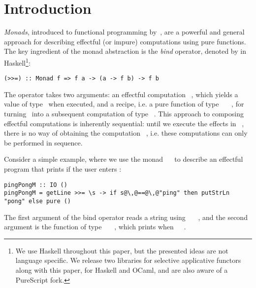 \section{Introduction}\label{sec-intro}


\emph{Monads}, introduced to functional programming
by~\citet{1995_wadler_monads}, are a powerful and general approach for
describing effectful (or impure) computations using pure functions. The key
ingredient of the monad abstraction is the \emph{bind} operator, denoted by
\hs{>>=} in Haskell\footnote{We use Haskell throughout this paper, but the
presented ideas are not language specific. We release two libraries for
selective applicative functors along with this paper, for Haskell and OCaml, and
are also aware of a PureScript fork.}:

\vspace{1mm}
\begin{verbatim}
(>>=) :: Monad f => f a -> (a -> f b) -> f b
\end{verbatim}
\vspace{1mm}

\noindent
The operator takes two arguments: an effectful computation ~, which
yields a value of type~ when executed, and a recipe, i.e. a pure function
of type ~\hs{->}~~, for turning~ into a subsequent
computation of type ~. This approach to composing effectful
computations is inherently sequential: until we execute the effects in
~, there is no way of obtaining the computation ~,
i.e. these computations can only be performed in sequence.

Consider a simple example, where we use the monad ~\hs{=}~ to
describe an effectful program that prints  if the user enters
:

\vspace{1mm}
\begin{verbatim}
pingPongM :: IO ()
pingPongM = getLine >>= \s -> if s@\,@==@\,@"ping" then putStrLn "pong" else pure ()
\end{verbatim}
\vspace{1mm}

\noindent
The first argument of the bind operator reads a string using
~\hs{::}~~, and the second argument is the
function of type ~\hs{->}~~\hs{()}, which prints 
when~~\hs{==}~.

